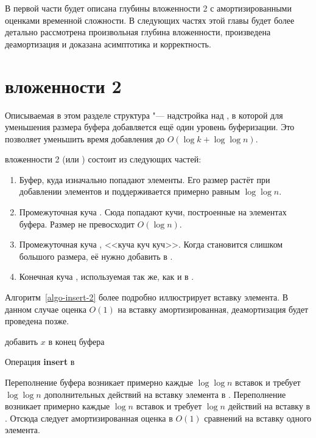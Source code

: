 В первой части будет описана \CH глубины вложенности 2 с амортизированными оценками
временной сложности. В следующих частях этой главы будет более детально рассмотрена
произвольная глубина вложенности, произведена деамортизация и доказана асимптотика
и корректность.

\section{\CH вложенности 2}
Описываемая в этом разделе структура "--- надстройка над \SCH, в которой
для уменьшения размера буфера добавляется ещё один уровень буферизации.
Это позволяет уменьшить время добавления до $O(\log k + \log \log n)$.

\CH вложенности 2 (или \CH[2]) состоит из следующих частей:

\begin{enumerate}
\item Буфер, куда изначально попадают элементы. Его размер растёт при добавлении
    элементов и поддерживается примерно равным $\log \log n$.
\item Промежуточная куча \MH[2]. Сюда попадают кучи, построенные на элементах
    буфера. Размер \MH[2] не превосходит $O(\log n)$.
\item Промежуточная куча \MH[1], <<куча куч куч>>. Когда \MH[2] становится
    слишком большого размера, её нужно добавить в \MH[1].
\item Конечная куча \HH, используемая так же, как и в \SCH.
\end{enumerate}

Алгоритм~\ref{algo-insert-2} более подробно иллюстрирует вставку элемента.
В данном случае оценка $O(1)$ на вставку амортизированная, деамортизация будет
проведена позже.

\begin{algorithm}[h]
 добавить $x$ в конец буфера\;
 \caption{Операция \textbf{insert} в \CH[2]}
 \label{algo-insert-2}
\end{algorithm}

Переполнение буфера возникает примерно каждые $\log\log n$ вставок
и требует $\log \log n$ дополнительных действий на вставку элемента
в \MH[2]. Переполнение
\MH[2] возникает примерно каждые $\log n$ вставок и требует $\log n$
действий на вставку в \MH[1]. Отсюда следует амортизированная оценка
в $O(1)$ сравнений на вставку одного элемента.

